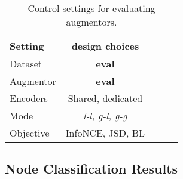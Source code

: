 \documentclass{article}
\theoremstyle{plain}
\theoremstyle{definition}
\theoremstyle{remark}
\begin{document}
\begin{table}[ht]
\caption{Control settings for evaluating augmentors.}
\label{table:exp_settings}
\vskip 0.15in
\begin{center}
\begin{small}
\begin{sc}
\begin{tabular}{lcccr}
\toprule
Setting & design choices\\
\midrule
Dataset     & \textbf{eval} \\
Augmentor   & \textbf{eval} \\
Encoders    &  Shared, dedicated \\
Mode    & \textit{l-l, g-l, g-g} \\
Objective   & InfoNCE, JSD, BL\\
\bottomrule
\end{tabular}
\end{sc}
\end{small}
\end{center}
\vskip -0.1in
\end{table}

\subsection{Node Classification Results}
\end{document}
